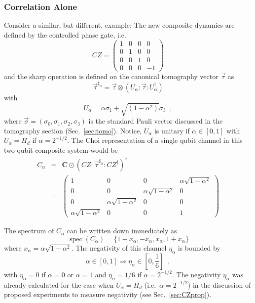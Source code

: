 \subsubsection{Correlation Alone}
Consider a similar, but different, example:  The new composite dynamics are defined by the controlled phase gate, i.e.\
$$
CZ = \begin{pmatrix}
1&0&0&0\\
0&1&0&0\\
0&0&1&0\\
0&0&0&-1
\end{pmatrix} 
$$
and the sharp operation is defined on the canonical tomography vector $\vec{\tau}$ as
$$
\vec{\tau}^{\sharp_\alpha} = \vec{\tau}\otimes\left(U_\alpha:\vec{\tau}:U_\alpha^\dagger\right)
$$
with
$$
U_\alpha = \alpha\sigma_1 + \sqrt{\left(1-\alpha^2\right)}\sigma_3\;\;,
$$
where $\vec{\sigma}=(\sigma_0,\sigma_1,\sigma_2,\sigma_3)$ is the standard Pauli vector discussed in the tomography section (Sec.\ \ref{sec:tomo}).  Notice, $U_\alpha$ is unitary if $\alpha\in[0,1]$ with $U_\alpha = H_d$ if $\alpha = 2^{-1/2}$.  The Choi representation of a single qubit channel in this two qubit composite system would be
\begin{eqnarray*}
C_\alpha &=& \mathbf{C}\odot\left(CZ:\vec{\tau}^{\sharp_\alpha}:CZ^\dagger\right)^\flat\\
&=& \begin{pmatrix}
 1 & 0 & 0 & \alpha \sqrt{1-\alpha^2} \\
 0 & 0 & \alpha \sqrt{1-\alpha^2} & 0 \\
 0 & \alpha \sqrt{1-\alpha^2} & 0 & 0 \\
 \alpha \sqrt{1-\alpha^2} & 0 & 0 & 1
\end{pmatrix}
\end{eqnarray*}

The spectrum of $C_\alpha$ can be written down immediately as
$$
\operatorname{spec}(C_\alpha) = \{1-x_\alpha,-x_\alpha,x_\alpha,1+x_\alpha\}
$$
where $x_\alpha = \alpha \sqrt{1-\alpha^2}$.  The negativity of this channel $\eta_\alpha$ is bounded by
$$
\alpha\in[0,1]\Rightarrow \eta_\alpha\in\left[0,\frac{1}{6}\right]\;\;,
$$
with $\eta_\alpha=0$ if $\alpha=0$ or $\alpha=1$ and $\eta_\alpha=1/6$ if $\alpha=2^{-1/2}$.  The negativity $\eta_\alpha$ was already calculated for the case when $U_\alpha=H_d$ (i.e.\ $\alpha=2^{-1/2}$) in the discussion of proposed experiments to measure negativity (see Sec.\ \ref{sec:CZprop}).

